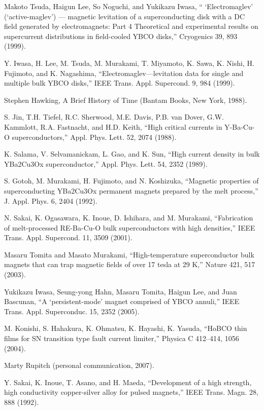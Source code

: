 \noindent [9.7] Makoto Tsuda, Haigun Lee, So Noguchi, and Yukikazu Iwasa, `` ‘Electromaglev’
(‘active-maglev’) — magnetic levitation of a superconducting disk with a DC field
generated by electromagnets: Part 4 Theoretical and experimental results on supercurrent
distributions in field-cooled YBCO disks,” Cryogenics 39, 893 (1999).

\noindent [9.8] Y. Iwasa, H. Lee, M. Tsuda, M. Murakami, T. Miyamoto, K. Sawa, K. Nishi,
H. Fujimoto, and K. Nagashima, ``Electromaglev—levitation data for single and
multiple bulk YBCO disks,” IEEE Trans. Appl. Supercond. 9, 984 (1999).

\noindent [9.9] Stephen Hawking, A Brief History of Time (Bantam Books, New York, 1988).

\noindent [9.10] S. Jin, T.H. Tiefel, R.C. Sherwood, M.E. Davis, P.B. van Dover, G.W. Kammlott,
R.A. Fastnacht, and H.D. Keith, ``High critical currents in Y-Ba-Cu-O superconductors,”
Appl. Phys. Lett. 52, 2074 (1988).

\noindent [9.11] K. Salama, V. Selvamanickam, L. Gao, and K. Sun, ``High current density in bulk
YBa2Cu3Ox superconductor,” Appl. Phys. Lett. 54, 2352 (1989).

\noindent [9.12] S. Gotoh, M. Murakami, H. Fujimoto, and N. Koshizuka, ``Magnetic properties of superconducting YBa2Cu3Ox permanent magnets prepared by the melt process,” J. Appl. Phys. 6, 2404 (1992).

\noindent [9.13] N. Sakai, K. Ogasawara, K. Inoue, D. Ishihara, and M. Murakami, ``Fabrication of melt-processed RE-Ba-Cu-O bulk superconductors with high densities,” IEEE Trans. Appl. Supercond. 11, 3509 (2001).

\noindent [9.14] Masaru Tomita and Masato Murakami, ``High-temperature superconductor bulk magnets that can trap magnetic fields of over 17 tesla at 29 K,” Nature 421, 517 (2003).

\noindent [9.15] Yukikazu Iwasa, Seung-yong Hahn, Masaru Tomita, Haigun Lee, and Juan Bascunan, ``A ‘persistent-mode’ magnet comprised of YBCO annuli,” IEEE Trans.
Appl. Superconduc. 15, 2352 (2005).

\noindent [9.16] M. Konishi, S. Hahakura, K. Ohmatsu, K. Hayashi, K. Yasuda, ``HoBCO thin films for SN transition type fault current limiter,” Physica C 412–414, 1056 (2004).

\noindent [9.17] Marty Rupitch (personal communication, 2007).

\noindent [9.18] Y. Sakai, K. Inoue, T. Asano, and H. Maeda, ``Development of a high strength, high conductivity copper-silver alloy for pulsed magnets,” IEEE Trans. Magn. 28, 888 (1992).

